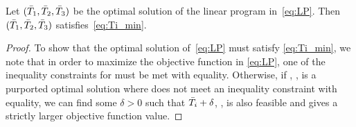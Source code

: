 

\begin{myLemma}
\label{lem:LPToMin}
	Let $(\bar{T}_{1}, \bar{T}_{2}, \bar{T}_{3})$ be the optimal solution of the linear program in~\eqref{eq:LP}.  Then $(\bar{T}_{1}, \bar{T}_{2}, \bar{T}_{3})$ satisfies~\eqref{eq:Ti_min}.
\end{myLemma}
\begin{proof}
To show that the optimal solution of~\eqref{eq:LP} must satisfy \eqref{eq:Ti_min}, we note that in order to maximize the objective function in \eqref{eq:LP}, one of the inequality constraints for  must be met with equality.  Otherwise, if , ,  is a purported optimal solution where  does not meet an inequality constraint with equality, we can find some $\delta > 0$ such that $\bar{T}_{i} + \delta$, ,  is also feasible and gives a strictly larger objective function value.
\end{proof}


